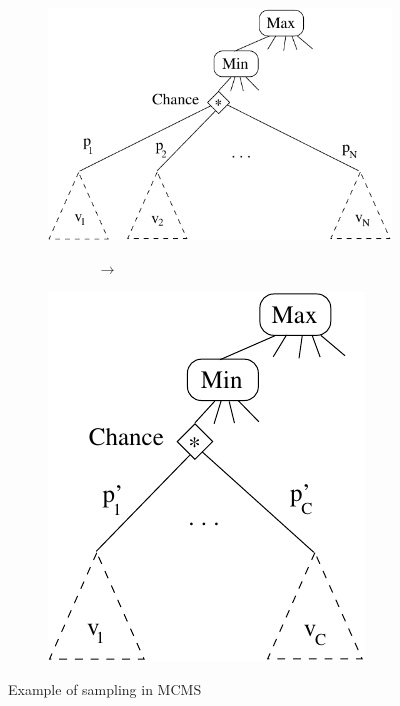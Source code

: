 \documentclass{article}
\begin{document}
\begin{figure}[t!]
        \centering
        \begin{subfigure}[m]{0.4\textwidth}
                \centering
                \includegraphics[width=\textwidth]{example}
        \end{subfigure}%
        ~~~~~~~~~~~~ $\rightarrow$ ~~~~~~~~~~~~
        \begin{subfigure}[m]{0.24\textwidth}
                \centering
                \includegraphics[width=\textwidth]{example2}
        \end{subfigure}
        \caption{Example of sampling in MCMS}\label{fig:example}
\end{figure}
\end{document}
